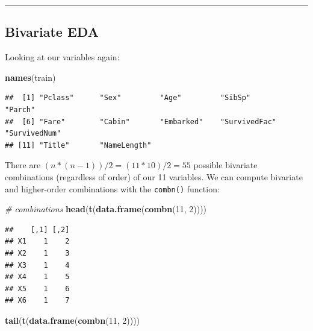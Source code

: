 \documentclass[]{article}
\newenvironment{Shaded}{\begin{snugshade}}{\end{snugshade}}
\newcommand{\KeywordTok}[1]{\textcolor[rgb]{0.13,0.29,0.53}{\textbf{#1}}}
\newcommand{\DecValTok}[1]{\textcolor[rgb]{0.00,0.00,0.81}{#1}}
\newcommand{\CommentTok}[1]{\textcolor[rgb]{0.56,0.35,0.01}{\textit{#1}}}
\newcommand{\NormalTok}[1]{#1}
\begin{document}
\begin{center}\rule{0.5\linewidth}{\linethickness}\end{center}

\subsection{Bivariate EDA}\label{bivariate-eda}

Looking at our variables again:

\begin{Shaded}
\begin{Highlighting}[]
\KeywordTok{names}\NormalTok{(train)}
\end{Highlighting}
\end{Shaded}

\begin{verbatim}
##  [1] "Pclass"      "Sex"         "Age"         "SibSp"       "Parch"      
##  [6] "Fare"        "Cabin"       "Embarked"    "SurvivedFac" "SurvivedNum"
## [11] "Title"       "NameLength"
\end{verbatim}

There are \((n * (n-1)) / 2 = (11 * 10)/2 = 55\) possible bivariate
combinations (regardless of order) of our 11 variables. We can compute
bivariate and higher-order combinations with the \texttt{combn()}
function:

\begin{Shaded}
\begin{Highlighting}[]
\CommentTok{# combinations}
\KeywordTok{head}\NormalTok{(}\KeywordTok{t}\NormalTok{(}\KeywordTok{data.frame}\NormalTok{(}\KeywordTok{combn}\NormalTok{(}\DecValTok{11}\NormalTok{, }\DecValTok{2}\NormalTok{))))}
\end{Highlighting}
\end{Shaded}

\begin{verbatim}
##    [,1] [,2]
## X1    1    2
## X2    1    3
## X3    1    4
## X4    1    5
## X5    1    6
## X6    1    7
\end{verbatim}

\begin{Shaded}
\begin{Highlighting}[]
\KeywordTok{tail}\NormalTok{(}\KeywordTok{t}\NormalTok{(}\KeywordTok{data.frame}\NormalTok{(}\KeywordTok{combn}\NormalTok{(}\DecValTok{11}\NormalTok{, }\DecValTok{2}\NormalTok{))))}
\end{Highlighting}
\end{Shaded}
\end{document}
